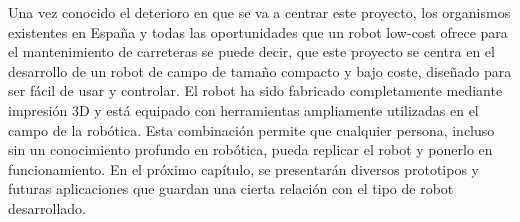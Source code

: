 Una vez conocido el deterioro en que se va a centrar este proyecto, los organismos existentes en España y todas las oportunidades que un robot low-cost ofrece para el mantenimiento de carreteras se puede decir, que este proyecto se centra en el desarrollo de un robot de campo de tamaño compacto y bajo coste, diseñado para ser fácil de usar y controlar. El robot ha sido fabricado completamente mediante impresión 3D y está equipado con herramientas ampliamente utilizadas en el campo de la robótica. Esta combinación permite que cualquier persona, incluso sin un conocimiento profundo en robótica, pueda replicar el robot y ponerlo en funcionamiento. En el próximo capítulo, se presentarán diversos prototipos y futuras aplicaciones que guardan una cierta relación con el tipo de robot desarrollado.\\



